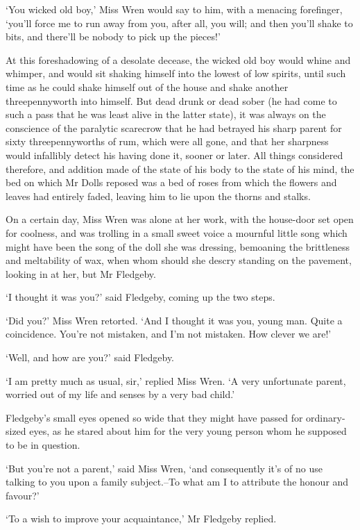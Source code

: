 ‘You wicked old boy,’ Miss Wren would say to him, with a menacing
forefinger, ‘you’ll force me to run away from you, after all, you will;
and then you’ll shake to bits, and there’ll be nobody to pick up the
pieces!’

At this foreshadowing of a desolate decease, the wicked old boy would
whine and whimper, and would sit shaking himself into the lowest of low
spirits, until such time as he could shake himself out of the house and
shake another threepennyworth into himself. But dead drunk or dead
sober (he had come to such a pass that he was least alive in the latter
state), it was always on the conscience of the paralytic scarecrow that
he had betrayed his sharp parent for sixty threepennyworths of rum,
which were all gone, and that her sharpness would infallibly detect his
having done it, sooner or later. All things considered therefore, and
addition made of the state of his body to the state of his mind, the bed
on which Mr Dolls reposed was a bed of roses from which the flowers
and leaves had entirely faded, leaving him to lie upon the thorns and
stalks.

On a certain day, Miss Wren was alone at her work, with the house-door
set open for coolness, and was trolling in a small sweet voice a
mournful little song which might have been the song of the doll she was
dressing, bemoaning the brittleness and meltability of wax, when whom
should she descry standing on the pavement, looking in at her, but Mr
Fledgeby.

‘I thought it was you?’ said Fledgeby, coming up the two steps.

‘Did you?’ Miss Wren retorted. ‘And I thought it was you, young man.
Quite a coincidence. You’re not mistaken, and I’m not mistaken. How
clever we are!’

‘Well, and how are you?’ said Fledgeby.

‘I am pretty much as usual, sir,’ replied Miss Wren. ‘A very unfortunate
parent, worried out of my life and senses by a very bad child.’

Fledgeby’s small eyes opened so wide that they might have passed for
ordinary-sized eyes, as he stared about him for the very young person
whom he supposed to be in question.

‘But you’re not a parent,’ said Miss Wren, ‘and consequently it’s of no
use talking to you upon a family subject.--To what am I to attribute the
honour and favour?’

‘To a wish to improve your acquaintance,’ Mr Fledgeby replied.


